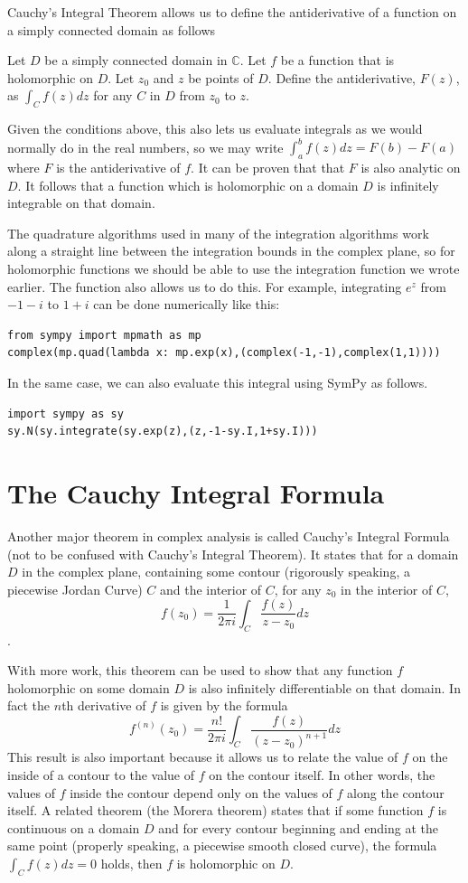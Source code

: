 Cauchy's Integral Theorem allows us to define the antiderivative of a function on a simply connected domain as follows
\begin{theorem}
Let $D$ be a simply connected domain in $\mathbb{C}$. Let $f$ be a function that is holomorphic on $D$.
Let $z_0$ and $z$ be points of $D$. Define the antiderivative, $F(z)$, as $\int_C f(z)dz$ for any $C$ in $D$ from $z_0$ to $z$.
\end{theorem}
Given the conditions above, this also lets us evaluate integrals as we would normally do in the real numbers, so we may write $\int_a^b f(z)dz=F(b)-F(a)$ where $F$ is the antiderivative of $f$.
It can be proven that that $F$ is also analytic on $D$.
It follows that a function which is holomorphic on a domain $D$ is infinitely integrable on that domain.

The quadrature algorithms used in many of the integration algorithms work along a straight line between the integration bounds in the complex plane, so for holomorphic functions we should be able to use the integration function we wrote earlier.
The  function also allows us to do this.
For example, integrating $e^z$ from $-1-i$ to $1+i$ can be done numerically like this:
\begin{lstlisting}[style=python]
from sympy import mpmath as mp
complex(mp.quad(lambda x: mp.exp(x),(complex(-1,-1),complex(1,1))))
\end{lstlisting}
In the same case, we can also evaluate this integral using SymPy as follows.
\begin{lstlisting}[style=python]
import sympy as sy
sy.N(sy.integrate(sy.exp(z),(z,-1-sy.I,1+sy.I)))
\end{lstlisting}

\section*{The Cauchy Integral Formula}

Another major theorem in complex analysis is called Cauchy's Integral Formula (not to be confused with Cauchy's Integral Theorem).
It states that for a domain $D$ in the complex plane, containing some contour (rigorously speaking, a piecewise Jordan Curve) $C$ and the interior of $C$, for any $z_0$ in the interior of $C$, 
$$f(z_0)=\frac{1}{2\pi i} \int_C \frac{f(z)}{z-z_0} dz$$. 

With more work, this theorem can be used to show that any function $f$ holomorphic on some domain $D$ is also infinitely differentiable on that domain.
In fact the $n$th derivative of $f$ is given by the formula $$f^{(n)}(z_0) = \frac{n!}{2\pi i} \int_C \frac{f(z)}{(z-z_0)^{n+1}} dz$$
This result is also important because it allows us to relate the value of $f$ on the inside of a contour to the value of $f$ on the contour itself.
In other words, the values of $f$ inside the contour depend only on the values of $f$ along the contour itself.
A related theorem (the Morera theorem) states that if some function $f$ is continuous on a domain $D$ and for every contour beginning and ending at the same point (properly speaking, a piecewise smooth closed curve), the formula $\int_C f(z) dz = 0$ holds, then $f$ is holomorphic on $D$. 

